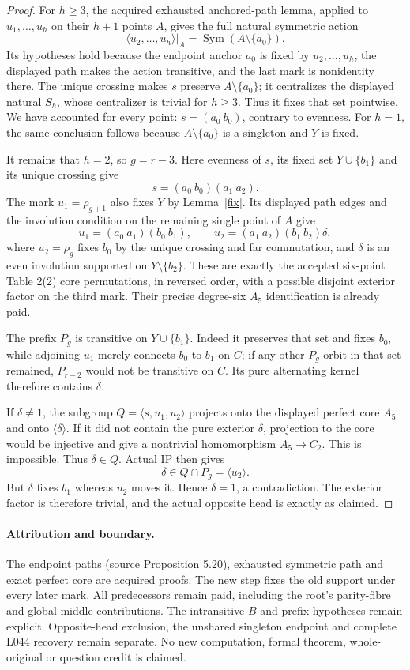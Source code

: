 \documentclass[11pt,a4paper]{article}
\newcommand{\gen}[1]{\langle#1\rangle}
\begin{document}
\begin{proof}
For $h\ge3$, the acquired exhausted anchored-path lemma,
applied to $u_1,\ldots,u_h$ on their $h+1$ points $A$,
gives the full natural symmetric action
\[
             \gen{u_2,\ldots,u_h}|_A
                    =\operatorname{Sym}(A\setminus\{a_0\}).
\]
Its hypotheses hold because the endpoint anchor $a_0$ is
fixed by $u_2,\ldots,u_h$, the displayed path makes the action
transitive, and the last mark is nonidentity there.
The unique crossing makes $s$ preserve $A\setminus\{a_0\}$;
it centralizes the displayed natural $S_h$, whose centralizer
is trivial for $h\ge3$. Thus it fixes that set pointwise.
We have accounted for every point: $s=(a_0\ b_0)$, contrary
to evenness. For $h=1$, the same conclusion follows because
$A\setminus\{a_0\}$ is a singleton and $Y$ is fixed.

It remains that $h=2$, so $g=r-3$. Here evenness of $s$,
its fixed set $Y\cup\{b_1\}$ and its unique crossing give
\[
 s=(a_0\ b_0)(a_1\ a_2).
\]
The mark $u_1=\rho_{g+1}$ also fixes $Y$ by
Lemma~\ref{fix}. Its displayed path edges and the involution
condition on the remaining single point of $A$ give
\[
 u_1=(a_0\ a_1)(b_0\ b_1),\qquad
 u_2=(a_1\ a_2)(b_1\ b_2)\delta,
\]
where $u_2=\rho_g$ fixes $b_0$ by the unique crossing and
far commutation, and $\delta$ is an even involution supported
on $Y\setminus\{b_2\}$. These are exactly the accepted
six-point Table 2(2) core permutations, in reversed order,
with a possible disjoint exterior factor on the third mark.
Their precise degree-six $A_5$ identification is already paid.

The prefix $P_g$ is transitive on $Y\cup\{b_1\}$.
Indeed it preserves that set and fixes $b_0$, while adjoining
$u_1$ merely connects $b_0$ to $b_1$ on $C$; if any other
$P_g$-orbit in that set remained, $P_{r-2}$ would not be
transitive on $C$. Its pure alternating kernel therefore
contains $\delta$.

If $\delta\ne1$, the subgroup $Q=\gen{s,u_1,u_2}$ projects
onto the displayed perfect core $A_5$ and onto $\gen\delta$.
If it did not contain the pure exterior $\delta$, projection
to the core would be injective and give a nontrivial homomorphism
$A_5\longrightarrow C_2$. This is impossible. Thus
$\delta\in Q$. Actual IP then gives
\[
            \delta\in Q\cap P_g=\gen{u_2}.
\]
But $\delta$ fixes $b_1$ whereas $u_2$ moves it. Hence
$\delta=1$, a contradiction. The exterior factor is therefore
trivial, and the actual opposite head is exactly as claimed.
\end{proof}

\paragraph{Attribution and boundary.}
The endpoint paths (source Proposition 5.20), exhausted symmetric
path and exact perfect core are acquired proofs. The new step
fixes the old support under every later mark. All predecessors
remain paid, including the root's parity-fibre and global-middle
contributions. The intransitive $B$ and prefix hypotheses remain
explicit. Opposite-head exclusion, the unshared singleton endpoint
and complete L044 recovery remain separate. No new computation,
formal theorem, whole-original or question credit is claimed.
\end{document}
